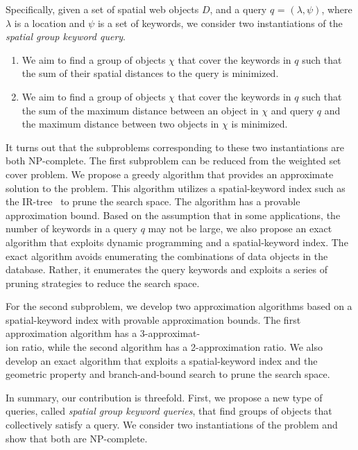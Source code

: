 \documentclass{sig-alternate}
\begin{document}
Specifically, given a set of spatial web objects $D$, and a query
$q$ = $(\lambda,\psi)$, where $\lambda$ is a location and $\psi$ is
a set of keywords, we consider two instantiations of the
\emph{spatial group
  keyword query}.

\begin{enumerate} \vspace{-1ex}
\item We aim to find a group of objects $\chi$ that cover the keywords
  in $q$ such that the sum of their spatial distances to the query is
  minimized. \vspace{-2ex}
\item We aim to find a group of objects $\chi$ that cover the keywords
  in $q$ such that the sum of the maximum distance between an object
  in $\chi$ and query $q$ and the maximum distance between two objects
  in $\chi$ is minimized.
\end{enumerate}

It turns out that the subproblems corresponding to these two
instantiations are both NP-complete.
%
The first subproblem can be reduced from the weighted set cover
problem. We propose a greedy algorithm that provides an approximate
solution to the problem. This algorithm utilizes a spatial-keyword
index such as the IR-tree~\cite{vldb09} to prune the search space.
The algorithm has a provable approximation bound.
%
Based on the assumption that in some applications, the number of
keywords in a query $q$ may not be large, we also propose an exact
algorithm that exploits dynamic programming and a spatial-keyword
index. The exact algorithm avoids enumerating the combinations of
data objects in the database. Rather, it enumerates the query
keywords and exploits a series of pruning strategies to reduce the
search space.

For the second subproblem, we develop two approximation algorithms
based on a spatial-keyword index with provable approximation bounds.
The first approximation algorithm has a 3-approximat-\\ion ratio, while
the second algorithm has a 2-approxi\-ma\-tion ratio. We also
develop an exact algorithm that exploits a spatial-keyword index and
the geometric property and branch-and-bound search to prune the
search space.

In summary, our contribution is threefold.  First, we propose a new
type of queries, called \emph{spatial group keyword queries}, that
find groups of objects that collectively satisfy a query. We
consider two instantiations of the problem and show that both are
NP-complete.
\end{document}
